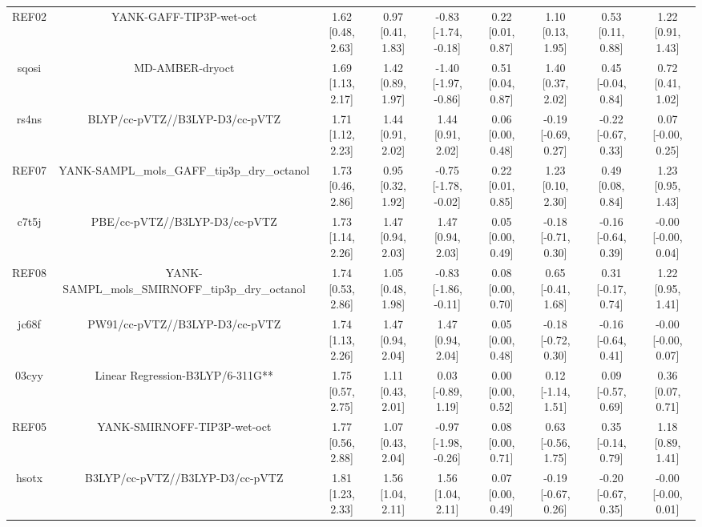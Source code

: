 \documentclass{article}
\begin{document}
\begin{center}
\begin{longtable}{|ccccccccc|}
 REF02 &                            YANK-GAFF-TIP3P-wet-oct &  1.62 [0.48, 2.63] &  0.97 [0.41, 1.83] &  -0.83 [-1.74, -0.18] &  0.22 [0.01, 0.87] &    1.10 [0.13, 1.95] &    0.53 [0.11, 0.88] &     1.22 [0.91, 1.43] \\
 sqosi &                                    MD-AMBER-dryoct &  1.69 [1.13, 2.17] &  1.42 [0.89, 1.97] &  -1.40 [-1.97, -0.86] &  0.51 [0.04, 0.87] &    1.40 [0.37, 2.02] &   0.45 [-0.04, 0.84] &     0.72 [0.41, 1.02] \\
 rs4ns &                     BLYP/cc-pVTZ//B3LYP-D3/cc-pVTZ &  1.71 [1.12, 2.23] &  1.44 [0.91, 2.02] &     1.44 [0.91, 2.02] &  0.06 [0.00, 0.48] &  -0.19 [-0.69, 0.27] &  -0.22 [-0.67, 0.33] &    0.07 [-0.00, 0.25] \\
 REF07 &        YANK-SAMPL\_mols\_GAFF\_tip3p\_dry\_octanol &  1.73 [0.46, 2.86] &  0.95 [0.32, 1.92] &  -0.75 [-1.78, -0.02] &  0.22 [0.01, 0.85] &    1.23 [0.10, 2.30] &    0.49 [0.08, 0.84] &     1.23 [0.95, 1.43] \\
 c7t5j &                      PBE/cc-pVTZ//B3LYP-D3/cc-pVTZ &  1.73 [1.14, 2.26] &  1.47 [0.94, 2.03] &     1.47 [0.94, 2.03] &  0.05 [0.00, 0.49] &  -0.18 [-0.71, 0.30] &  -0.16 [-0.64, 0.39] &   -0.00 [-0.00, 0.04] \\
 REF08 &    YANK-SAMPL\_mols\_SMIRNOFF\_tip3p\_dry\_octanol &  1.74 [0.53, 2.86] &  1.05 [0.48, 1.98] &  -0.83 [-1.86, -0.11] &  0.08 [0.00, 0.70] &   0.65 [-0.41, 1.68] &   0.31 [-0.17, 0.74] &     1.22 [0.95, 1.41] \\
 jc68f &                     PW91/cc-pVTZ//B3LYP-D3/cc-pVTZ &  1.74 [1.13, 2.26] &  1.47 [0.94, 2.04] &     1.47 [0.94, 2.04] &  0.05 [0.00, 0.48] &  -0.18 [-0.72, 0.30] &  -0.16 [-0.64, 0.41] &   -0.00 [-0.00, 0.07] \\
 03cyy &                   Linear Regression-B3LYP/6-311G** &  1.75 [0.57, 2.75] &  1.11 [0.43, 2.01] &    0.03 [-0.89, 1.19] &  0.00 [0.00, 0.52] &   0.12 [-1.14, 1.51] &   0.09 [-0.57, 0.69] &     0.36 [0.07, 0.71] \\
 REF05 &                        YANK-SMIRNOFF-TIP3P-wet-oct &  1.77 [0.56, 2.88] &  1.07 [0.43, 2.04] &  -0.97 [-1.98, -0.26] &  0.08 [0.00, 0.71] &   0.63 [-0.56, 1.75] &   0.35 [-0.14, 0.79] &     1.18 [0.89, 1.41] \\
 hsotx &                    B3LYP/cc-pVTZ//B3LYP-D3/cc-pVTZ &  1.81 [1.23, 2.33] &  1.56 [1.04, 2.11] &     1.56 [1.04, 2.11] &  0.07 [0.00, 0.49] &  -0.19 [-0.67, 0.26] &  -0.20 [-0.67, 0.35] &   -0.00 [-0.00, 0.01] \\

\end{longtable}
\end{center}
\end{document}
